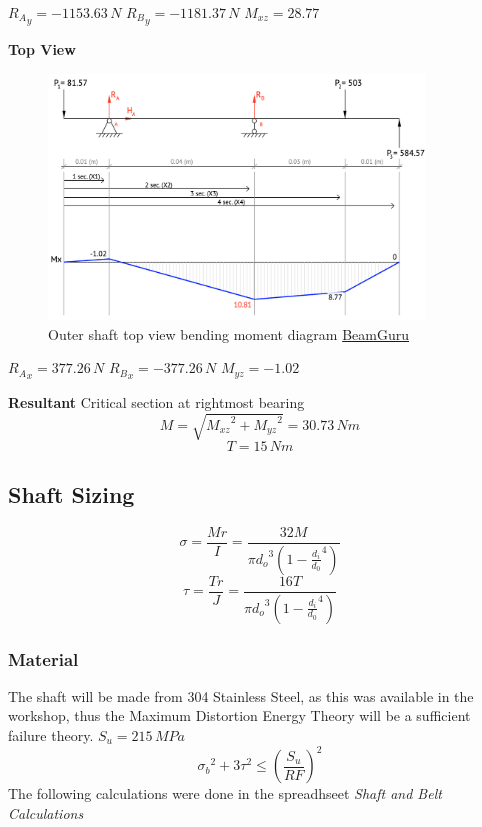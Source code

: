 \documentclass[11pt, titlepage]{article}
\begin{document}
${R_{A}}_y = -1153.63\,N$ \hfill
${R_{B}}_y = -1181.37\,N$\hfill
$M_{xz}=28.77$\newline

\noindent\textbf{Top View}
\begin{figure}[h]
\centering
	\includegraphics[width=10cm]{outer_shaft_top_bmd.png}
	\caption{Outer shaft top view bending moment diagram \href{beamguru.com/online/beam-calculator/?save=88759fc0e73600b1a941d8defae4d6b8}{BeamGuru}}
\end{figure}

${R_{A}}_x = 377.26\,N$ \hfill
${R_{B}}_x = -377.26\,N$\hfill
$M_{yz}=-1.02$\newline

\noindent\textbf{Resultant}\newline
Critical section at rightmost bearing
$$M = \sqrt{{M_{xz}}^2 + {M_{yz}}^2} = 30.73\,Nm$$
$$T = 15\,Nm$$

\subsection{Shaft Sizing}
\begin{equation}
	\sigma = \frac{Mr}{I} = \frac{32M}{\pi{d_o}^3(1-\frac{d_i}{d_0}^4)}
\end{equation}
\begin{equation}
	\tau = \frac{Tr}{J} = \frac{16 T}{\pi{d_o}^3(1-\frac{d_i}{d_0}^4)}
\end{equation}

\subsubsection{Material}
The shaft will be made from 304 Stainless Steel, as this was available in the workshop, thus the Maximum Distortion Energy Theory will be a sufficient failure theory.\newline\newline
$S_u = 215\,MPa$
\begin{equation}
	{\sigma_b}^2 + 3\tau^2 \le (\frac{S_u}{RF})^2
\end{equation}
The following calculations were done in the spreadhseet \textit{Shaft and Belt Calculations}
\end{document}
